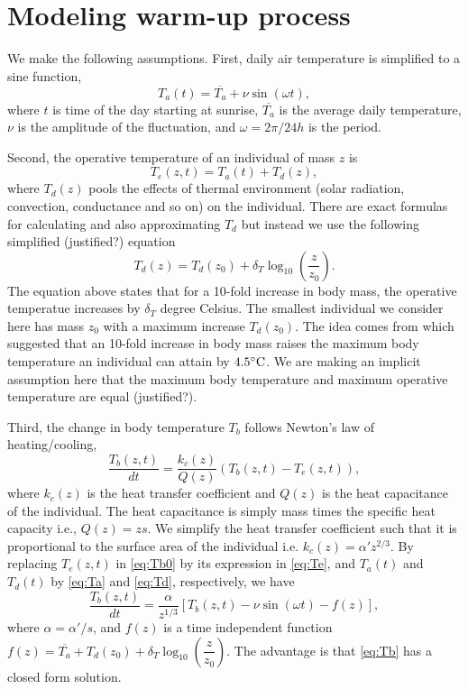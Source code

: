 \section*{Modeling warm-up process} %
\label{sec:modeling_warm_up_process}
%
We make the following assumptions.
First, daily air temperature is simplified to a sine function,
\begin{equation} \label{eq:Ta}
	T_a(t) = \overline{T_a} + \nu \sin(\omega t),
\end{equation}
where $t$ is time of the day starting at sunrise, $\overline{T_a}$ is the average daily temperature, $\nu$ is the amplitude of the fluctuation, and $\omega = 2 \pi /24 h$ is the period.

Second, the operative temperature of an individual of mass $z$ is 
\begin{equation} \label{eq:Te}
	T_e(z,t) = T_a(t) + T_d(z),
\end{equation}
where $T_d(z)$ pools the effects of thermal environment (solar radiation, convection, conductance and so on) on the individual. 
There are exact formulas for calculating and also approximating $T_d$ \citep[e.g.,][]{Stevenson1985, Angilletta2009} but instead we use the following simplified (justified?) equation
\begin{equation} \label{eq:Td}
 	T_d(z) = T_d(z_0) + \delta_T \log_{10} \left(\frac{z}{z_0} \right).   
\end{equation} 
 The equation above states that for a 10-fold increase in body mass, the operative temperatue increases by $\delta_T$ degree Celsius.
 The smallest individual we consider here has mass $z_0$ with a maximum increase $T_d(z_0)$.
 The idea comes from \citet{Stevenson1985} which suggested that an 10-fold increase in body mass raises the maximum body temperature an individual can attain by $4.5 ^\circ \rm{C}$.
 We are making an implicit assumption here that the maximum body temperature and maximum operative temperature are equal (justified?).

 Third, the change in body temperature $T_b$ follows Newton's law of heating/cooling,
 \begin{equation} \label{eq:Tb0}
 	\frac{T_b(z,t)}{dt} = \frac{k_c(z)}{Q(z)} \left( T_b(z,t) - T_e(z,t)\right),
 \end{equation}
 where $k_c(z)$ is the heat transfer coefficient and $Q(z)$ is the heat capacitance of the individual.
The heat capacitance is simply mass times the specific heat capacity i.e., $Q(z) = z s$.
We simplify the heat transfer coefficient such that it is proportional to the surface area of the individual i.e. $k_c(z) = \alpha' z^{2/3}$.
By replacing $T_e(z,t)$ in \cref{eq:Tb0} by its expression in \cref{eq:Te}, and $T_a(t)$ and $T_d(t)$ by \cref{eq:Ta} and \cref{eq:Td}, respectively, we have
\begin{equation} \label{eq:Tb}
	\frac{T_b(z,t)}{dt} = \frac{\alpha}{z^{1/3}} \left[ T_b(z,t) - \nu \sin(\omega t) - f(z) \right],
\end{equation} 
where $\alpha = \alpha'/s$, and $f(z)$ is a time independent function $f(z) = \overline{T_a} + T_d(z_0) + \delta_T \log_{10} \left( \dfrac{z}{z_0} \right)$.
%
The advantage is that \cref{eq:Tb} has a closed form solution.


